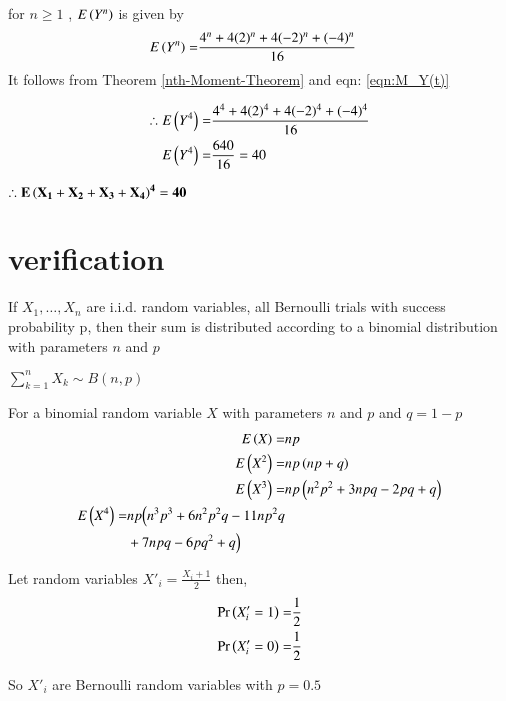 \documentclass[journal,12pt,twocolumn]{IEEEtran}
\begin{document}
\begin{theorem}
for $n \geq 1$ , $E\left(Y^n\right)$ is given by
\begin{align}
    E\left(Y^n\right)=&\frac{4^n+4(2)^n+4(-2)^n+(-4)^n}{16} 
\end{align}
It follows from Theorem \ref{nth-Moment-Theorem} and eqn: \eqref{eqn:M_Y(t)}
\label{exp_yn}
\end{theorem}


\begin{align}
   \therefore E\left(Y^4\right)=&\frac{4^4+4(2)^4+4(-2)^4+(-4)^4}{16} 
    \\E\left(Y^4\right)=&\frac{640}{16}=40
\end{align}

{\centering
$\mathbf{\therefore E\left(X_1+X_2 +X_3 +X_4\right)^4=40}$

}
\section{verification}
\begin{theorem}
If ${ X_{1},\dots ,X_{n}}$ are i.i.d. random variables, all Bernoulli trials with success probability p, then their sum is distributed according to a binomial distribution with parameters $n$ and $p$

{\centering
${\displaystyle \sum _{k=1}^{n}X_{k}\sim  {B} (n,p)}$

}
\label{binom_theorem}
\end{theorem}

For a binomial random variable $X$ with parameters $n$ and $p$ and $q=1-p$
\begin{align}
    E\left(X\right)=& n p 
    \\E\left(X^2\right)=& n p \left(n p+q\right)
    \\E\left(X^3\right)=& n p \left(n^{2} p^{2} + 3 n p q - 2 p q + q\right)
    \\
    \begin{split}
         E\left(X^4\right)=&n p \Bigl(n^{3} p^{3} + 6 n^{2} p^{2} q
        - 11 n p^{2} q  \\& + 7 n p q - 6 p q^{2} + q\Bigr)
    \end{split}
\end{align}


Let random variables $X'_i=\frac{X_i+1}{2}$ then,
\begin{align}
    \Pr\left(X'_i=1\right)=&\frac{1}{2}
    \\\Pr\left(X'_i=0\right)=&\frac{1}{2}
\end{align}

So $X'_i$ are Bernoulli random variables with $p=0.5$
\end{document}
